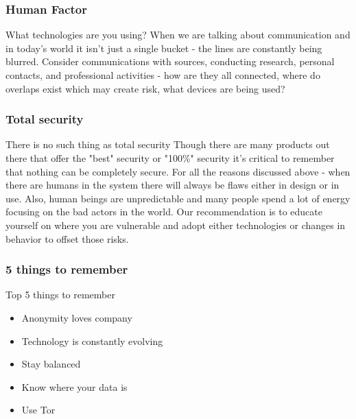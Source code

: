 \documentclass{beamer}
\begin{document}
\begin{frame}
\frametitle{Human Factor}
        \begin{block}{What technologies are you using?}
		When we are talking about communication and in today's world it isn’t just a single bucket - the lines are constantly being blurred.  Consider communications with sources, conducting research, personal contacts, and professional activities - how are they all connected, where do overlaps exist which may create risk, what devices are being used?
        \end{block}
\end{frame}

\begin{frame}
\frametitle{Total security}
        \begin{block}{There is no such thing as total security}
		Though there are many products out there that offer the "best" security or "100\%" security it's critical to remember that nothing can be completely secure.  For all the reasons discussed above - when there are humans in the system there will always be flaws either in design or in use.  Also, human beings are unpredictable and many people spend a lot of energy focusing on the bad actors in the world.  Our recommendation is to educate yourself on where you are vulnerable and adopt either technologies or changes in behavior to offset those risks.
        \end{block}
\end{frame}

\begin{frame}
\frametitle{5 things to remember}
	\begin{block}{Top 5 things to remember}
        	\begin{itemize}
			\item<1-> Anonymity loves company
			\item<2-> Technology is constantly evolving
			\item<3-> Stay balanced	
			\item<4-> Know where your data is
			\item<5-> Use Tor
		\end{itemize}
	\end{block}
\end{frame}
\end{document}
